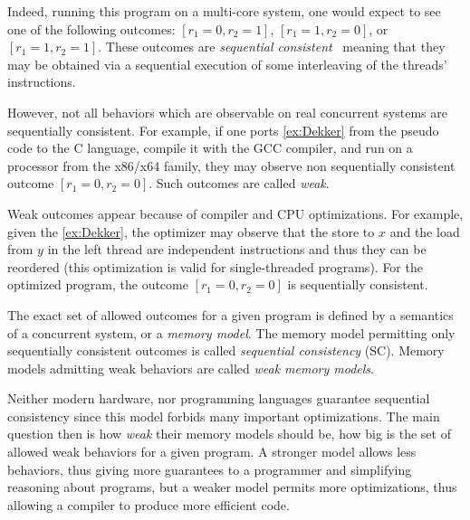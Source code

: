 Indeed, running this program on a multi-core system, one would expect to see 
one of the following outcomes: ${[r_1=0, r_2=1]}$, ${[r_1=1,r_2=0]}$, or ${[r_1=1,r_2=1]}$.
These outcomes are \emph{sequential consistent}~\cite{Lamport:TC79} meaning
that they may be obtained via a sequential execution 
of some interleaving of the threads' instructions.



However, not all behaviors which are observable on real concurrent systems are sequentially consistent. 
For example, if one ports \ref{ex:Dekker} 
from the pseudo code to the C language, compile it with the GCC compiler, 
and run on a processor from the x86/x64 family,
they may observe non sequentially consistent outcome $[r_1=0, r_2=0]$.
Such outcomes are called \emph{weak}.

Weak outcomes appear because of compiler and CPU optimizations.
For example, given the \ref{ex:Dekker},
the optimizer may observe that the store to $x$ and the load from $y$ in the left thread
are independent instructions and thus they can be reordered
(this optimization is valid for single-threaded programs).
For the optimized program, the outcome $[r_1=0, r_2=0]$
is sequentially consistent.

The exact set of allowed outcomes for a given program 
is defined by a semantics of a concurrent system, or a \emph{memory model}.
The memory model permitting only sequentially consistent outcomes 
is called \emph{sequential consistency} (SC).
Memory models admitting weak behaviors are called \emph{weak memory models}.

Neither modern hardware, nor programming languages 
guarantee sequential consistency since this model forbids many important optimizations.
The main question then is how \emph{weak} their memory models should be,
\ie how big is the set of allowed weak behaviors for a given program.
A stronger model allows less behaviors, thus giving more guarantees to a programmer
and simplifying reasoning about programs, but a weaker model permits more optimizations,
thus allowing a compiler to produce more efficient code.

